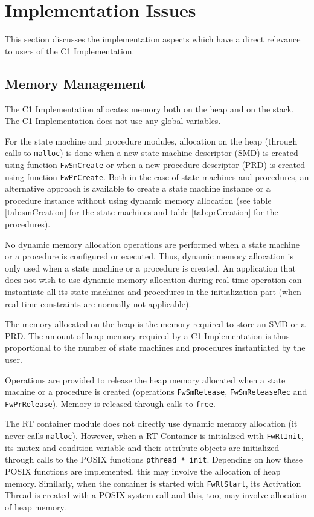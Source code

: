 \documentclass[manual]{../fwprofile}
\begin{document}
\section{Implementation Issues}
This section discusses the implementation aspects which have a direct relevance to users of the C1 Implementation.

\subsection{Memory Management}
The C1 Implementation allocates memory both on the heap and on the stack. The C1 Implementation does not use any global variables.

For the state machine and procedure modules, allocation on the heap (through calls to \texttt{malloc}) is done when a new state machine descriptor (SMD) is created using function \texttt{FwSmCreate} or when a new procedure descriptor (PRD) is created using function \texttt{FwPrCreate}. Both in the case of state machines and procedures, an alternative approach is available to create a state machine instance or a procedure instance without using dynamic memory allocation (see table \ref{tab:smCreation} for the state machines and table \ref{tab:prCreation} for the procedures). 

No dynamic memory allocation operations are performed when a state machine or a procedure is configured or executed. Thus, dynamic memory allocation is only used when a state machine or a procedure is created. An application that does not wish to use dynamic memory allocation during real-time operation can instantiate all its state machines and procedures in the initialization part (when real-time constraints are normally not applicable). 

The memory allocated on the heap is the memory required to store an SMD or a PRD. The amount of heap memory required by a C1 Implementation is thus proportional to the number of state machines and procedures instantiated by the user.

Operations are provided to release the heap memory allocated when a state machine or a procedure is created (operations \texttt{FwSmRelease}, \texttt{FwSmReleaseRec} and \texttt{FwPrRelease}). Memory is released through calls to \texttt{free}.

The RT container module does not directly use dynamic memory allocation (it never calls \texttt{malloc}). However, when a RT Container is initialized with \texttt{FwRtInit}, its mutex and condition variable and their attribute objects are initialized through calls to the POSIX functions \texttt{pthread\_*\_init}. Depending on how these POSIX functions are implemented, this may involve the allocation of heap memory. Similarly, when the container is started with \texttt{FwRtStart}, its Activation Thread is created with a POSIX system call and this, too, may involve allocation of heap memory. 
\end{document}
